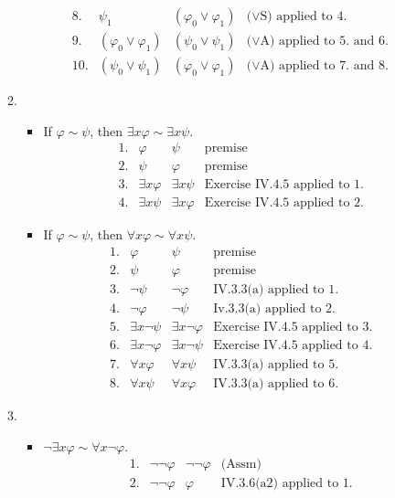 \begin{enumerate}[1.]
\begin{enumerate}[(1)]
\[\begin{array}{llll}
8. & \psi_1 & (\varphi_0 \lor \varphi_1) & \mbox{($\lor$S) applied to 4.} \\
9. & (\varphi_0 \lor \varphi_1) & (\psi_0 \lor \psi_1) & \mbox{($\lor$A) applied to 5. and 6.} \\
10. & (\psi_0 \lor \psi_1) & (\varphi_0 \lor \varphi_1) & \mbox{($\lor$A) applied to 7. and 8.}
\end{array}
\]
\item
\begin{itemize}
\item If $\varphi \sim \psi$, then $\exists x \varphi \sim \exists x \psi$.
\[
\begin{array}{llll}
1. & \varphi & \psi & \mbox{premise} \\
2. & \psi & \varphi & \mbox{premise} \\
3. & \exists x \varphi & \exists x \psi & \mbox{Exercise IV.4.5 applied to 1.} \\
4. & \exists x \psi & \exists x \varphi & \mbox{Exercise IV.4.5 applied to 2.}
\end{array}
\]
\item If $\varphi \sim \psi$, then $\forall x \varphi \sim \forall x \psi$.
\[
\begin{array}{llll}
1. & \varphi & \psi & \mbox{premise} \\
2. & \psi & \varphi & \mbox{premise} \\
3. & \neg \psi & \neg \varphi & \mbox{IV.3.3(a) applied to 1.} \\
4. & \neg \varphi & \neg \psi & \mbox{Iv.3.3(a) applied to 2.} \\
5. & \exists x \neg \psi & \exists x \neg \varphi & \mbox{Exercise IV.4.5 applied to 3.} \\
6. & \exists x \neg \varphi & \exists x \neg \psi & \mbox{Exercise IV.4.5 applied to 4.} \\
7. & \forall x \varphi & \forall x \psi & \mbox{IV.3.3(a) applied to 5.} \\
8. & \forall x \psi & \forall x \varphi & \mbox{IV.3.3(a) applied to 6.}
\end{array}
\]
\end{itemize}
\item
\begin{itemize}
\item $\neg \exists x \varphi \sim \forall x \neg \varphi$.
\[
\begin{array}{llll}
1. & \neg \neg \varphi & \neg \neg \varphi & \mbox{(Assm)} \\
2. & \neg \neg \varphi & \varphi & \mbox{IV.3.6(a2) applied to 1.} \\

\end{array}\]
\end{itemize}
\end{enumerate}
\end{enumerate}
